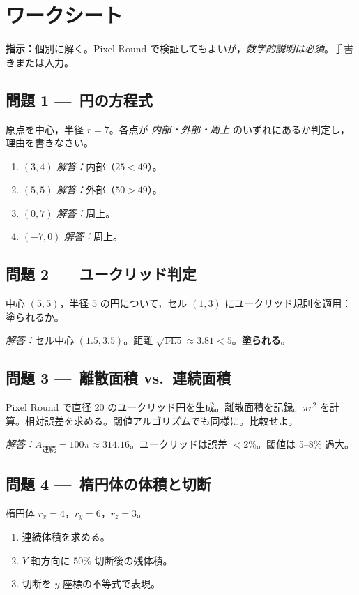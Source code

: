 \documentclass[12pt,a4paper]{scrartcl}
\newcommand{\acc}[1]{\textcolor{accent}{\textbf{#1}}}
\begin{document}
\newpage
\section{ワークシート}\label{ap:wk}

\textbf{指示：}個別に解く。Pixel Round で検証してもよいが，\emph{数学的説明は必須}。手書きまたは入力。

\subsection*{問題 1 ---\, 円の方程式}
原点を中心，半径 $r = 7$。各点が \emph{内部・外部・周上} のいずれにあるか判定し，理由を書きなさい。
\begin{enumerate}[label=\alph*),leftmargin=1.5em,itemsep=0.1em,topsep=0.2em,nosep]
  \item $(3, 4)$ \hfill \emph{解答：}内部（$25 < 49$）。
  \item $(5, 5)$ \hfill \emph{解答：}外部（$50 > 49$）。
  \item $(0, 7)$ \hfill \emph{解答：}周上。
  \item $(-7, 0)$ \hfill \emph{解答：}周上。
\end{enumerate}

\subsection*{問題 2 ---\, ユークリッド判定}
中心 $(5, 5)$，半径 $5$ の円について，セル $(1, 3)$ にユークリッド規則を適用：塗られるか。

\emph{解答：}セル中心 $(1.5, 3.5)$。距離 $\sqrt{14.5} \approx 3.81 < 5$。\acc{塗られる}。

\subsection*{問題 3 ---\, 離散面積 vs.\ 連続面積}
Pixel Round で直径 20 のユークリッド円を生成。離散面積を記録。$\pi r^2$ を計算。相対誤差を求める。閾値アルゴリズムでも同様に。比較せよ。

\emph{解答：}$A_{\text{連続}} = 100\pi \approx 314.16$。ユークリッドは誤差 $< 2\%$。閾値は 5--8\% 過大。

\subsection*{問題 4 ---\, 楕円体の体積と切断}
楕円体 $r_x = 4$，$r_y = 6$，$r_z = 3$。
\begin{enumerate}[label=\alph*),leftmargin=1.5em,itemsep=0.1em,topsep=0.2em,nosep]
  \item 連続体積を求める。
  \item $Y$ 軸方向に 50\% 切断後の残体積。
  \item 切断を $y$ 座標の不等式で表現。
\end{enumerate}
\end{document}
